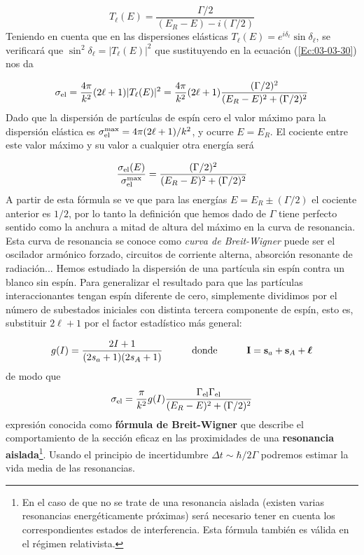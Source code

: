 \begin{equation}
	T_\ell (E) = \frac{\Gamma/2}{(E_R-E)-i(\Gamma/2)}
\end{equation}
Teniendo en cuenta que en las dispersiones elásticas $T_\ell(E)=e^{i\delta_\ell}\sin \delta_\ell$, se verificará que $\sin^2 \delta_\ell = |T_\ell(E)|^2$ que sustituyendo en la ecuación (\ref{Ec:03-03-30}) nos da

\begin{equation}
	\sigma_{\text{el}} = \frac{4\pi}{k^2} (2\ell+1) |T_\ell (E) |^2 = \frac{4\pi}{k^2} (2\ell +1) \frac{(\Gamma/2)^2}{(E_R-E)^2 + (\Gamma/2)^2}
\end{equation}
Dado que la dispersión de partículas de espín cero el valor máximo para la dispersión elástica es $\sigma_{\text{el}}^{\max} = 4 \pi (2\ell+1)/k^2$, y ocurre $E=E_R$. El cociente entre este valor máximo y su valor a cualquier otra energía será

\begin{equation}
	\frac{\sigma_{\text{el}}(E)}{\sigma_{\text{el}}^{\max}} = \frac{(\Gamma/2)^2}{(E_R-E)^2 + (\Gamma/2)^2}
\end{equation}
A partir de esta fórmula se ve que para las energías $E=E_R\pm (\Gamma/2)$ el cociente anterior es $1/2$, por lo tanto la definición que hemos dado de $\Gamma$ tiene perfecto sentido como la anchura a mitad de altura del máximo en la curva de resonancia. Esta curva de resonancia se conoce como \textit{curva de Breit-Wigner} puede ser el oscilador armónico forzado, circuitos de corriente alterna, absorción resonante de radiación... Hemos estudiado la dispersión de una partícula sin espín contra un blanco sin espín. Para generalizar el resultado para que las partículas interaccionantes tengan espín diferente de cero, simplemente dividimos por el número de subestados iniciales con distinta tercera componente de espín, esto es, substituir $2\ell+1$ por el factor estadístico más general:

\begin{equation}
	g(I) = \frac{2I+1}{(2s_a+1)(2s_A+1)} \quad \quad \quad \text{donde} \quad \quad \quad \mathbf{I} = \mathbf{s}_a + \mathbf{s}_A + \boldsymbol{\ell}
\end{equation}
de modo que
\begin{equation}
	\sigma_{\text{el}} = \frac{\pi}{k^2} g(I) \frac{\Gamma_{\text{el}} \Gamma_{\text{el}}}{(E_R-E)^2 + (\Gamma/2)^2} \label{Ec:03-03-50}
\end{equation} 
expresión conocida como \textbf{fórmula de Breit-Wigner} que describe el comportamiento de la sección eficaz en las proximidades de una \textbf{resonancia aislada}\footnote{En el caso de que no se trate de una resonancia aislada (existen varias resonancias energéticamente próximas) será necesario tener en cuenta los correspondientes estados de interferencia. Esta fórmula también es válida en el régimen relativista.}. Usando el principio de incertidumbre $\Delta t \sim \hbar /2\Gamma$ podremos estimar la vida media de las resonancias.


